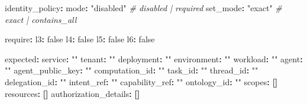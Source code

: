 \documentclass[
]{article}
\newenvironment{Shaded}{}{}
\newcommand{\AttributeTok}[1]{\textcolor[rgb]{0.49,0.56,0.16}{#1}}
\newcommand{\CharTok}[1]{\textcolor[rgb]{0.25,0.44,0.63}{#1}}
\newcommand{\CommentTok}[1]{\textcolor[rgb]{0.38,0.63,0.69}{\textit{#1}}}
\newcommand{\FunctionTok}[1]{\textcolor[rgb]{0.02,0.16,0.49}{#1}}
\newcommand{\KeywordTok}[1]{\textcolor[rgb]{0.00,0.44,0.13}{\textbf{#1}}}
\newcommand{\StringTok}[1]{\textcolor[rgb]{0.25,0.44,0.63}{#1}}
\begin{document}
\begin{Shaded}
\begin{Highlighting}[]
\FunctionTok{identity\_policy}\KeywordTok{:}
\AttributeTok{  }\FunctionTok{mode}\KeywordTok{:}\AttributeTok{ }\StringTok{"disabled"}\CommentTok{        \# disabled | required}
\AttributeTok{  }\FunctionTok{set\_mode}\KeywordTok{:}\AttributeTok{ }\StringTok{"exact"}\CommentTok{       \# exact | contains\_all}

\AttributeTok{  }\FunctionTok{require}\KeywordTok{:}
\AttributeTok{    }\FunctionTok{l3}\KeywordTok{:}\AttributeTok{ }\CharTok{false}
\AttributeTok{    }\FunctionTok{l4}\KeywordTok{:}\AttributeTok{ }\CharTok{false}
\AttributeTok{    }\FunctionTok{l5}\KeywordTok{:}\AttributeTok{ }\CharTok{false}
\AttributeTok{    }\FunctionTok{l6}\KeywordTok{:}\AttributeTok{ }\CharTok{false}

\AttributeTok{  }\FunctionTok{expected}\KeywordTok{:}
\AttributeTok{    }\FunctionTok{service}\KeywordTok{:}\AttributeTok{ }\StringTok{""}
\AttributeTok{    }\FunctionTok{tenant}\KeywordTok{:}\AttributeTok{ }\StringTok{""}
\AttributeTok{    }\FunctionTok{deployment}\KeywordTok{:}\AttributeTok{ }\StringTok{""}
\AttributeTok{    }\FunctionTok{environment}\KeywordTok{:}\AttributeTok{ }\StringTok{""}
\AttributeTok{    }\FunctionTok{workload}\KeywordTok{:}\AttributeTok{ }\StringTok{""}
\AttributeTok{    }\FunctionTok{agent}\KeywordTok{:}\AttributeTok{ }\StringTok{""}
\AttributeTok{    }\FunctionTok{agent\_public\_key}\KeywordTok{:}\AttributeTok{ }\StringTok{""}
\AttributeTok{    }\FunctionTok{computation\_id}\KeywordTok{:}\AttributeTok{ }\StringTok{""}
\AttributeTok{    }\FunctionTok{task\_id}\KeywordTok{:}\AttributeTok{ }\StringTok{""}
\AttributeTok{    }\FunctionTok{thread\_id}\KeywordTok{:}\AttributeTok{ }\StringTok{""}
\AttributeTok{    }\FunctionTok{delegation\_id}\KeywordTok{:}\AttributeTok{ }\StringTok{""}
\AttributeTok{    }\FunctionTok{intent\_ref}\KeywordTok{:}\AttributeTok{ }\StringTok{""}
\AttributeTok{    }\FunctionTok{capability\_ref}\KeywordTok{:}\AttributeTok{ }\StringTok{""}
\AttributeTok{    }\FunctionTok{ontology\_id}\KeywordTok{:}\AttributeTok{ }\StringTok{""}
\AttributeTok{    }\FunctionTok{scopes}\KeywordTok{:}\AttributeTok{ }\KeywordTok{[]}
\AttributeTok{    }\FunctionTok{resources}\KeywordTok{:}\AttributeTok{ }\KeywordTok{[]}
\AttributeTok{    }\FunctionTok{authorization\_details}\KeywordTok{:}\AttributeTok{ }\KeywordTok{[]}
\end{Highlighting}
\end{Shaded}
\end{document}
